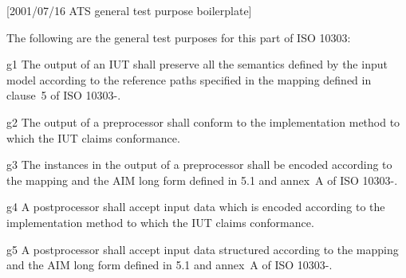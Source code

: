 [2001/07/16 ATS general test purpose boilerplate]

    The following are the general test purposes for this part of
ISO 10303:

g1 The output of an IUT shall preserve all the semantics defined by
   the input model according to the reference paths specified in the
   mapping \maptableorspec{} defined in clause~5 of ISO 10303-\theAPpartno.

g2 The output of a preprocessor shall conform to the implementation
   method to which the IUT claims conformance.

g3 The instances in the output of a preprocessor shall be encoded
   according to the mapping \maptableorspec{} and the AIM \Express{} long form
   defined in 5.1 and annex~A of ISO 10303-\theAPpartno.

g4 A postprocessor shall accept input data which is encoded according
   to the implementation method to which the IUT claims conformance.

g5 A postprocessor shall accept input data structured
   according to the mapping \maptableorspec{}
   and the AIM \Express{} long form
   defined in 5.1 and annex~A of ISO 10303-\theAPpartno.

\par

\endinput
